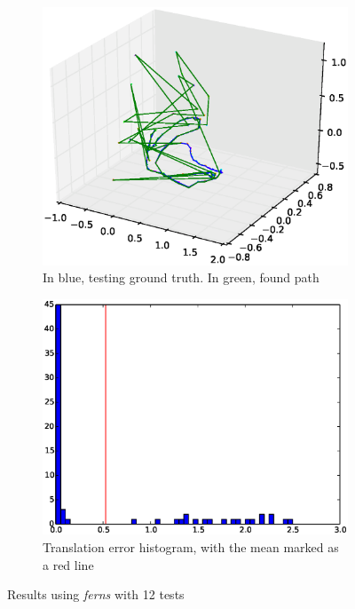 \begin{figure}[htpb]
  \begin{subfigure}[b]{6cm}
          \includegraphics[width=\linewidth]{img/large_desktop/ferns_100_path.eps}
          \caption{In blue, testing ground truth. In green, found path}                
          \label{fig:large_desktop_ferns_path}
  \end{subfigure}   
  \qquad
  \begin{subfigure}[b]{6cm}
          \includegraphics[width=\linewidth]{img/large_desktop/ferns_100_dist.eps}
          \caption{Translation error histogram, with the mean marked as a red line}                
          \label{fig:large_desktop_ferns_dist}
  \end{subfigure}
  \caption{Results using \textit{ferns} with 12 tests}
\end{figure}

